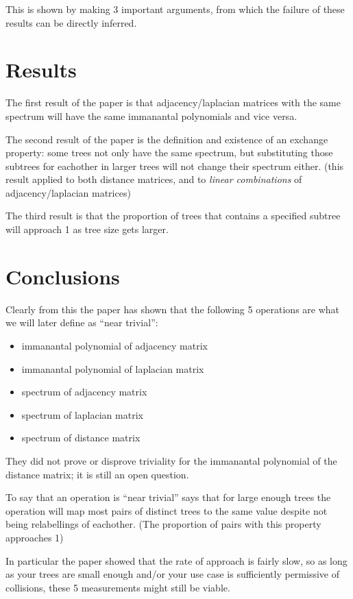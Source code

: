 \documentclass[10pt,a4paper]{report}
\begin{document}
This is shown by making 3 important arguments, from which the failure of these
results can be directly inferred.

\section{Results}

The first result of the paper is that adjacency/laplacian matrices with the
same spectrum will have the same immanantal polynomials and vice versa.

The second result of the paper is the definition and existence of an exchange
property: some trees not only have the same spectrum, but substituting those
subtrees for eachother in larger trees will not change their spectrum either.
(this result applied to both distance matrices, and to \emph{linear
combinations} of adjacency/laplacian matrices)

The third result is that the proportion of trees that contains a specified
subtree will approach 1 as tree size gets larger.

\section{Conclusions}

Clearly from this the paper has shown that the following 5 operations are what
we will later define as ``near trivial'':
\begin{itemize}
	\item immanantal polynomial of adjacency matrix
	\item immanantal polynomial of laplacian matrix
	\item spectrum of adjacency matrix
	\item spectrum of laplacian matrix
	\item spectrum of distance matrix
\end{itemize}

They did not prove or disprove triviality for the immanantal polynomial of the
distance matrix; it is still an open question.

To say that an operation is ``near trivial'' says that for large enough trees
the operation will map most pairs of distinct trees to the same value despite
not being relabellings of eachother. (The proportion of pairs with this
property approaches 1)

In particular the paper showed that the rate of approach is fairly slow, so as
long as your trees are small enough and/or your use case is sufficiently
permissive of collisions, these 5 measurements might still be viable.
\end{document}
